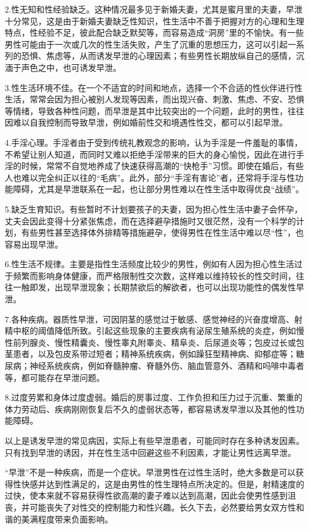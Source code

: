 \documentclass[12pt,UTF8]{ctexbook}
\begin{document}
2.性无知和性经验缺乏。这种情况最多见于新婚夫妻，尤其是蜜月里的夫妻，早泄十分常见，这是由于新婚夫妻缺乏性知识，性生活中不善于把握对方的心理和生理特点，性经验不足，彼此配合缺乏默契等，而容易造成“洞房”里的不愉快。有一些男性可能由于一次或几次的性生活失败，产生了沉重的思想压力，这可以引起一系列的恐惧、焦虑等，从而诱发早泄的心理因素；有些男性长期放纵自己的感情，沉湎于声色之中，也可诱发早泄。

3.性生活环境不佳。在一个不适宜的时间和地点，选择一个不合适的性伙伴进行性生活，常常会因为担心被别人发现等因素，而出现兴奋、刺激、焦虑、不安、恐惧等情绪，导致各种性问题，而早泄是其中比较突出的一个问题，此时的男性，往往因难以自我控制而导致早泄，例如婚前性交和境遇性性交，都可以引起早泄。

4.手淫心理。手淫者由于受到传统礼教观念的影响，认为手淫是一件羞耻的事情，不希望让别人知道，而同时又难以拒绝手淫带来的巨大的身心愉悦，因此在进行手淫的时候，常常不自觉地养成了快速获得高潮的“快枪手”习惯。即使在婚后，有些人也难以完全纠正以往的“毛病”。此外，部分“手淫有害论”者，还常将手淫与性功能障碍，尤其是早泄联系在一起，也让部分男性难以在性生活中取得优良“战绩”。

5.缺乏生育知识。有些暂时不计划要孩子的夫妻，因为担心性生活中妻子会怀孕，丈夫会因此变得十分紧张焦虑，而在选择避孕措施时又很茫然，没有一个科学的计划，有些男性甚至选择体外排精等措施避孕，使得男性在性生活中难以尽“性”，也容易出现早泄。

6.性生活不规律。主要是指性生活频度比较少的男性，例如有人因为担心性生活过于频繁而影响身体健康，而严格限制性交次数，这样难以维持较长的性交时间，往往一触即发，出现早泄现象；长期禁欲后的解欲者，也可以出现功能性的偶发性早泄。

7.各种疾病。器质性早泄，可因阴茎的感觉过于敏感、感觉神经的兴奋度增高、射精中枢的阈值降低所致。引起这些现象的主要疾病有泌尿生殖系统的炎症，例如慢性前列腺炎、慢性精囊炎、慢性睾丸附睾炎、精阜炎、后尿道炎等；包皮过长或包茎患者，以及包皮系带过短者；精神系统疾病，例如躁狂型精神病、抑郁症等；糖尿病；神经系统疾病，例如脊髓肿瘤、脊髓外伤、脑血管意外、酒精和吗啡中毒者等，都可能存在早泄问题。

8.过度劳累和身体过度虚弱。婚后的房事过度、工作负担和压力过于沉重、繁重的体力劳动后、疾病刚刚恢复后不久的虚弱状态等，都容易诱发早泄以及其他的性功能障碍。

以上是诱发早泄的常见病因，实际上有些早泄患者，可能同时存在多种诱发因素。只有找到早泄的诱因，并在性生活中回避这些不利因素，才能让男性远离早泄。

“早泄”不是一种疾病，而是一个症状。早泄男性在过性生活时，绝大多数是可以获得性快感并达到性满足的，这是由男性的性生理特点所决定的。但是，射精速度的过快，使本来就不容易获得性欲高潮的妻子难以达到高潮，因此会使男性感到沮丧，并可能丧失了对性交的控制能力和性兴趣。长久下去，必然要给男女双方性和谐的美满程度带来负面影响。
\end{document}

